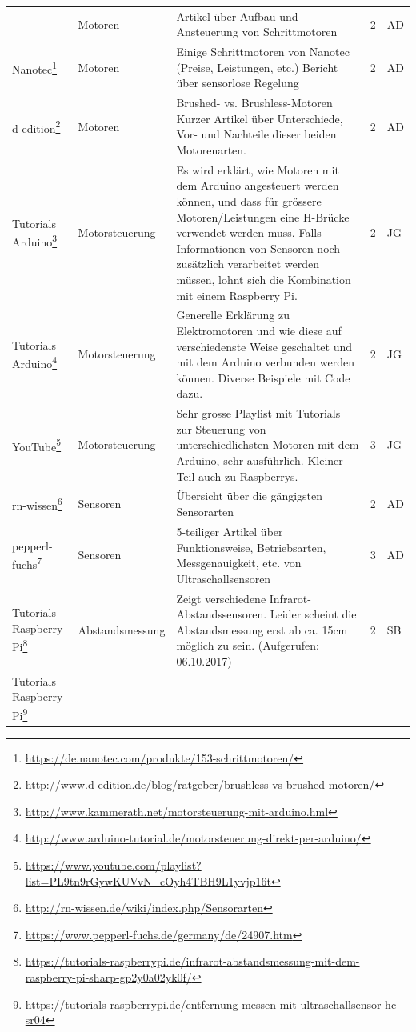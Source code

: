 \documentclass[a4paper,11pt]{scrartcl}
\begin{document}
\begin{landscape}
{\begin{longtable}{|p{4cm}|p{4cm}|p{12cm}|l|l|}
& Motoren
& Artikel über Aufbau und Ansteuerung von Schrittmotoren
& 2
& AD \\
Nanotec\footnote{\url{https://de.nanotec.com/produkte/153-schrittmotoren/}}
& Motoren
& Einige Schrittmotoren von Nanotec (Preise, Leistungen, etc.) Bericht über sensorlose Regelung
& 2 
& AD \\
d-edition\footnote{\url{http://www.d-edition.de/blog/ratgeber/brushless-vs-brushed-motoren/}}
& Motoren
& Brushed- vs. Brushless-Motoren Kurzer Artikel über Unterschiede, Vor- und Nachteile dieser beiden Motorenarten.
& 2 
& AD \\
Tutorials Arduino\footnote{\url{http://www.kammerath.net/motorsteuerung-mit-arduino.hml}}
& Motorsteuerung
& Es wird erklärt, wie Motoren mit dem Arduino angesteuert werden können, und dass für grössere Motoren/Leistungen eine H-Brücke verwendet werden muss. Falls Informationen von Sensoren noch zusätzlich verarbeitet werden müssen, lohnt sich die Kombination mit einem Raspberry Pi.
& 2 
& JG \\
Tutorials Arduino\footnote{\url{http://www.arduino-tutorial.de/motorsteuerung-direkt-per-arduino/}}
& Motorsteuerung
& Generelle Erklärung zu Elektromotoren und wie diese auf verschiedenste Weise geschaltet und mit dem Arduino verbunden werden können. Diverse Beispiele mit Code dazu.
& 2 
& JG \\
YouTube\footnote{\url{https://www.youtube.com/playlist?list=PL9tn9rGywKUVvN_cOyh4TBH9L1yvjp16t}}
& Motorsteuerung
& Sehr grosse Playlist mit Tutorials zur Steuerung von unterschiedlichsten Motoren mit dem Arduino, sehr ausführlich. Kleiner Teil auch zu Raspberrys.
& 3 
& JG \\
rn-wissen\footnote{\url{http://rn-wissen.de/wiki/index.php/Sensorarten}}
& Sensoren
& Übersicht über die gängigsten Sensorarten
& 2 
& AD \\
pepperl-fuchs\footnote{\url{https://www.pepperl-fuchs.de/germany/de/24907.htm}}
& Sensoren
& 5-teiliger Artikel über Funktionsweise, Betriebsarten, Messgenauigkeit, etc. von Ultraschallsensoren
& 3 
& AD \\
Tutorials Raspberry Pi\footnote{\url{https://tutorials-raspberrypi.de/infrarot-abstandsmessung-mit-dem-raspberry-pi-sharp-gp2y0a02yk0f/}}
& Abstandsmessung
& Zeigt verschiedene Infrarot-Abstandssensoren. Leider scheint die Abstandsmessung erst ab ca. 15cm möglich zu sein. (Aufgerufen: 06.10.2017)
& 2 
& SB \\
Tutorials Raspberry Pi\footnote{\url{https://tutorials-raspberrypi.de/entfernung-messen-mit-ultraschallsensor-hc-sr04}}

\end{longtable}}
\end{landscape}
\end{document}
